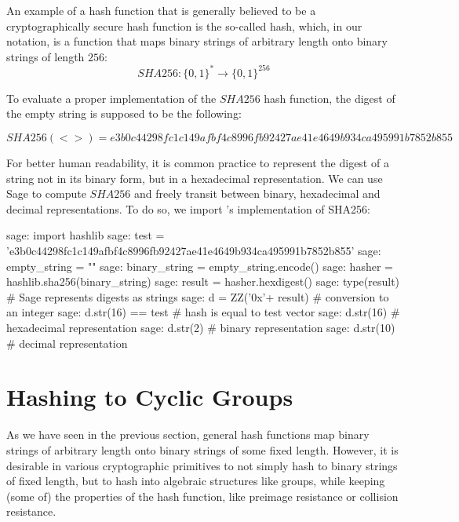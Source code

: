 \begin{example}\label{ex:SHA256}An example of a hash function that is generally believed to be a cryptographically secure hash function is the so-called  hash, which, in our notation, is a function that maps binary strings of arbitrary length onto binary strings of length $256$:
\begin{equation}
SHA256: \{0,1\}^* \to \{0,1\}^{256}
\end{equation}

To evaluate a proper implementation of the $SHA256$ hash function, the digest of the empty string is supposed to be the following:
 
\begin{equation}
SHA256(<>)= {\scriptstyle e3b0c44298fc1c149afbf4c8996fb92427ae41e4649b934ca495991b7852b855}
\end{equation}

For better human readability, it is common practice to represent the digest of a string not in its binary form, but in a hexadecimal representation. We can use Sage to compute $SHA256$ and freely transit between binary, hexadecimal and decimal representations. To do so, we import 's implementation of SHA256:
\begin{sagecommandline}
sage: import hashlib
sage: test = 'e3b0c44298fc1c149afbf4c8996fb92427ae41e4649b934ca495991b7852b855' 
sage: empty_string = ""
sage: binary_string = empty_string.encode()
sage: hasher = hashlib.sha256(binary_string) 
sage: result = hasher.hexdigest()
sage: type(result)	# Sage represents digests as strings
sage: d = ZZ('0x'+ result) # conversion to an integer
sage: d.str(16) == test	# hash is equal to test vector
sage: d.str(16) # hexadecimal representation
sage: d.str(2) # binary representation
sage: d.str(10) # decimal representation
\end{sagecommandline}
\end{example}

\section{Hashing to Cyclic Groups}\label{sec:hashing-to-groups} 
As we have seen in the previous section, general hash functions map binary strings of arbitrary length onto binary strings of some fixed length. However, it is desirable in various cryptographic primitives to not simply hash to binary strings of fixed length, but to hash into algebraic structures like groups, while keeping (some of) the properties of the hash function, like preimage resistance or collision resistance.

